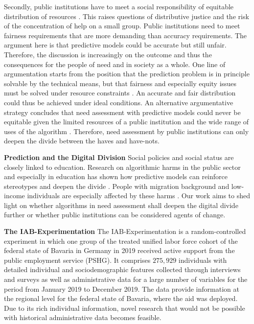 \documentclass{article} %
\begin{document}
Secondly, public institutions have to meet a social responsibility of equitable distribution of resources \citep{kleinberg2015prediction}. This raises questions of distributive justice and the risk of the concentration of help on a small group. Public institutions need to meet fairness requirements that are more demanding than accuracy requirements. The argument here is that predictive models could be accurate but still unfair. Therefore, the discussion is increasingly on the outcome and thus the consequences for the people of need and in society as a whole. One line of argumentation starts from the position that the prediction problem is in principle solvable by the technical means, but that fairness and especially equity issues must be solved under resource constraints \citep{loriprovist2022,pmlr-v235-perdomo24a, wilder2024learning}. An accurate and fair distribution could thus be achieved under ideal conditions. An alternative argumentative strategy concludes that need assessment with predictive models could never be equitable given the limited resources of a public institution and the wide range of uses of the algorithm \citep{simone2022}. Therefore, need assessment by public institutions can only deepen the divide between the haves and have-nots.

\textbf{Prediction and the Digital Division}
Social policies and social status are closely linked to education. Research on algorithmic harms in the public sector and especially in education has shown how predictive models can reinforce stereotypes and deepen the divide \citep{chouldechova2018case}. People with migration background and low-income individuals are especially affected by these harms \citep{perdomo2023difficult}. Our work aims to shed light on whether algorithms in need assessment shall deepen the digital divide further or whether public institutions can be considered agents of change.

\textbf{The IAB-Experimentation} The IAB-Experimentation \cite{10.1145/3588001.3609369} is a random-controlled experiment in which one group of the treated unified labor force cohort of the federal state of Bavaria in Germany in 2019 received active support from the public employment service (PSHG). It comprises $275{,}929$ individuals with detailed individual and sociodemographic features collected through interviews and surveys as well as administrative data for a large number of variables for the period from January 2019 to December 2019. The data provide information at the regional level for the federal state of Bavaria, where the aid was deployed. Due to its rich individual information, novel research that would not be possible with historical administrative data becomes feasible.
\end{document}
